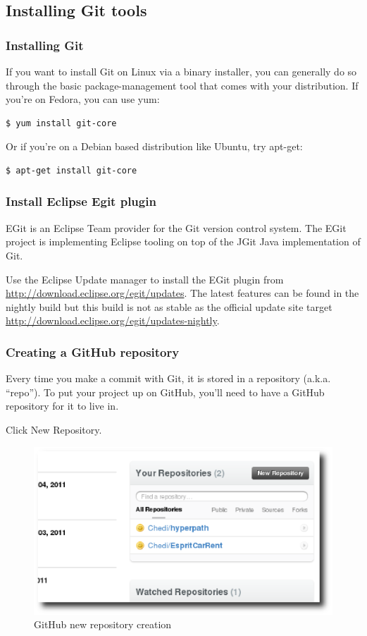 \subsection{Installing Git tools}

\subsubsection{Installing Git}
If you want to install Git on Linux via a binary installer, you can generally do
so through the basic package-management tool that comes with your distribution.
If you’re on Fedora, you can use yum:
\begin{verbatim}
$ yum install git-core
\end{verbatim}
Or if you’re on a Debian based distribution like Ubuntu, try apt-get:
\begin{verbatim}
$ apt-get install git-core
\end{verbatim}

\subsubsection{Install Eclipse Egit plugin}
EGit is an Eclipse Team provider for the Git version control system. The EGit
project is implementing Eclipse tooling on top of the JGit Java implementation of
Git.\cite{eclipse:wiki:egit}

Use the Eclipse Update manager to install the EGit plugin from
\url{http://download.eclipse.org/egit/updates}. The latest features can be
found in the nightly build but this build is not as stable as the official update site
target \url{http://download.eclipse.org/egit/updates-nightly}.


\subsubsection{Creating a GitHub repository}
Every time you make a commit with Git, it is stored in a repository (a.k.a.
``repo''). To put your project up on GitHub, you’ll need to have a GitHub
repository for it to live in.

Click New Repository.
\begin{figure}[!htb]
  \begin{center}
    \includegraphics[scale=0.8]{Figures/GitHub_new_repo.eps}
  \end{center}
  \label{GitHub new repository creation}
  \caption{GitHub new repository creation}
\end{figure}

